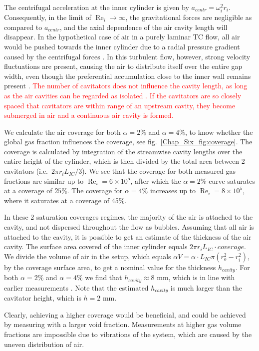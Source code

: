 \documentclass[aps,onecolumn,10pt, floatfix, superscriptaddress,longbibliography, pra]{revtex4-1}
\newcommand{\red}[1]{\textcolor{red}{#1}}
\renewcommand{\Re}{\operatorname{Re}}
\begin{document}
The centrifugal acceleration at the inner cylinder is given by $a_{centr} = \omega_i^2 r_i$. Consequently, in the limit of $\Re_i \rightarrow \infty$, the gravitational forces are negligible as compared to $a_{centr}$, and the axial dependence of the air cavity length will disappear.
In the hypothetical case of air in a purely laminar TC flow, all air would be pushed towards the inner cylinder due to a radial pressure gradient caused by the centrifugal forces \citep{gil13}. In this turbulent flow, however, strong velocity fluctuations are present, causing the air to distribute itself over the entire gap width, even though the preferential accumulation close to the inner wall remains present \citep{gil13}.
\red{The number of cavitators does not influence the cavity length, as long as the air cavities can be regarded as isolated \citep{Zverkhovskyi2014}. If the cavitators are so closely spaced that cavitators are within range of an upstream cavity, they become submerged in air and a continuous air cavity is formed.}

We calculate the air coverage for both $\alpha=2\%$ and $\alpha=4\%$, to know whether the global gas fraction influences the coverage, see fig.\ \ref{Chap_Six_fig:coverage}. The coverage is calculated by integration of the streamwise cavity lengths over the entire height of the cylinder, which is then divided by the total area between 2 cavitators (i.e.\ $2 \pi r_i L_{IC} / 3$). We see that the coverage for both measured gas fractions are similar up to $\Re_i = 6 \times 10^5$, after which the $\alpha=2\%$-curve saturates at a coverage of $25\%$. The coverage for $\alpha=4\%$ increases up to $\Re_i=8\times10^5$, where it saturates at a coverage of 45\%.

In these 2 saturation coverages regimes, the majority of the air is attached to the cavity, and not dispersed throughout the flow as bubbles. Assuming that all air is attached to the cavity, it is possible to get an estimate of the thickness of the air cavity. The surface area covered of the inner cylinder equals $2\pi r_i L_{IC}\cdot coverage$. We divide the volume of air in the setup, which equals $\alpha V= \alpha \cdot L_{IC} \pi(r_o^2-r_i^2)$, by the coverage surface area, to get a nominal value for the thickness $h_{cavity}$. For both $\alpha=2\%$ and $\alpha=4\%$ we find that $h_{cavity}\approx8$ mm, which is in line with earlier measurements \citep{Zverkhovskyi2014}. Note that the estimated $h_{cavity}$ is much larger than the cavitator height, which is $h=2$ mm. 

Clearly, achieving a higher coverage would be beneficial, and could be achieved by measuring with a larger void fraction. Measurements at higher gas volume fractions are impossible due to vibrations of the system, which are caused by the uneven distribution of air.
\end{document}
